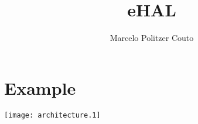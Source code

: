 \documentclass{article}
\title{eHAL}
\author{Marcelo Politzer Couto}
\begin{document}
\maketitle

\section{Example}
\texttt{[image: architecture.1]}
\end{document}
